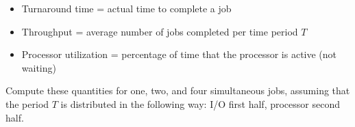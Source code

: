 \documentclass[11pt,largemargins]{homework}
\begin{document}
\maketitle

\begin{itemize}[noitemsep,topsep=0pt]
    \item Turnaround time = actual time to complete a job
    \item Throughput = average number of jobs completed per time period $T$
    \item Processor utilization = percentage of time that the processor is
    active (not waiting)
\end{itemize}
Compute these quantities for one, two, and four simultaneous jobs, assuming that
the period $T$ is distributed in the following way: I/O first half, processor
second half.
\end{document}
